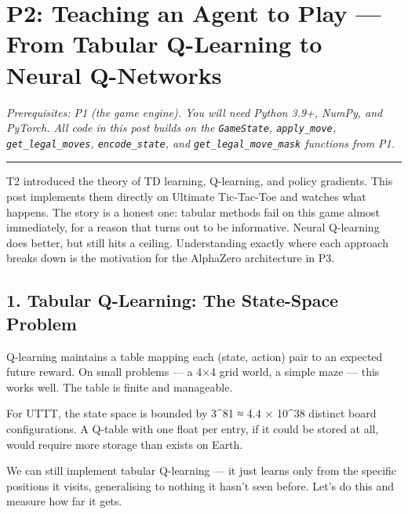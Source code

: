 \hypertarget{p2-teaching-an-agent-to-play-from-tabular-q-learning-to-neural-q-networks}{%
\section{P2: Teaching an Agent to Play --- From Tabular Q-Learning to
Neural
Q-Networks}\label{p2-teaching-an-agent-to-play-from-tabular-q-learning-to-neural-q-networks}}

\emph{Prerequisites: P1 (the game engine). You will need Python 3.9+,
NumPy, and PyTorch. All code in this post builds on the
\texttt{GameState}, \texttt{apply\_move}, \texttt{get\_legal\_moves},
\texttt{encode\_state}, and \texttt{get\_legal\_move\_mask} functions
from P1.}

\begin{center}\rule{0.5\linewidth}{0.5pt}\end{center}

T2 introduced the theory of TD learning, Q-learning, and policy
gradients. This post implements them directly on Ultimate Tic-Tac-Toe
and watches what happens. The story is a honest one: tabular methods
fail on this game almost immediately, for a reason that turns out to be
informative. Neural Q-learning does better, but still hits a ceiling.
Understanding exactly where each approach breaks down is the motivation
for the AlphaZero architecture in P3.

\hypertarget{tabular-q-learning-the-state-space-problem}{%
\subsection{1. Tabular Q-Learning: The State-Space
Problem}\label{tabular-q-learning-the-state-space-problem}}

Q-learning maintains a table mapping each (state, action) pair to an
expected future reward. On small problems --- a 4×4 grid world, a simple
maze --- this works well. The table is finite and manageable.

For UTTT, the state space is bounded by 3\^{}81 ≈ 4.4 × 10\^{}38
distinct board configurations. A Q-table with one float per entry, if it
could be stored at all, would require more storage than exists on Earth.

We can still implement tabular Q-learning --- it just learns only from
the specific positions it visits, generalising to nothing it hasn't seen
before. Let's do this and measure how far it gets.

